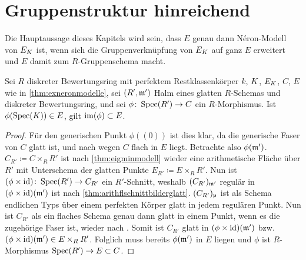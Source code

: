
  
\section{Gruppenstruktur hinreichend}\label{chap:gruppenstrukturhinreichend}
Die Hauptaussage dieses Kapitels wird sein, dass $E$ genau dann
Néron-Modell von $E_{K}$ ist, wenn sich die Gruppenverknüpfung von
$E_{K}$ auf ganz $E$ erweitert und $E$ damit zum $R$-Gruppenschema
macht.
\begin{Lemma}\label{thm:schnittearithmflglatt}
  Sei $R$ diskreter Bewertungsring mit perfektem Restklassenkörper
  $k$, $K$, $E_{K}$, $C$, $E$ wie in \ref{thm:exneronmodelle},
  sei $(R',\mathfrak{m}')$ Halm eines glatten $R$-Schemas und diskreter
  Bewertungsring,
  und sei $\phi\colon \operatorname{Spec}(R')\to C$ ein $R$-Morphismus.
  Ist $\phi(\operatorname{Spec}(K))\in E$, gilt $\operatorname{im}(\phi)\subset E$.
  \begin{proof}
    Für den generischen Punkt $\phi((0))$ ist dies klar, da die
    generische Faser von $C$ glatt ist, und nach
    \cite[8.5, Proposition 17]{bosch} wegen $C$ flach in $E$ liegt.
    Betrachte also $\phi(\mathfrak{m}')$.
    $C_{R'}\coloneqq C\times_R R'$ ist nach
    \ref{thm:eigminmodell} wieder eine arithmetische Fläche über
    $R'$ mit Unterschema der glatten Punkte
    $E_{R'}\coloneqq E\times_R R'$.
    Nun ist $(\phi\times\mathrm{id})\colon\operatorname{Spec}(R')\to C_{R'}$ ein
    $R'$-Schnitt, weshalb $(C_{R'})_{\mathfrak{m}'}$ regulär in
    $(\phi\times\mathrm{id})(\mathfrak{m}')$ ist nach
    \ref{thm:arithflschnittbilderglatt}.
    $(C_{R'})_{\mathfrak{p}}$ ist als Schema endlichen Typs über einem
    perfekten Körper glatt in jedem regulären Punkt.
    Nun ist $C_{R'}$ als ein flaches Schema genau dann glatt in
    einem Punkt, wenn es die zugehörige Faser ist, wieder nach
    \cite[8.5, Proposition 17]{bosch}.
    Somit ist $C_{R'}$ glatt in $(\phi\times\mathrm{id})(\mathfrak{m}')$ bzw.
    $(\phi\times\mathrm{id})(\mathfrak{m}')\in E\times_R R'$. Folglich muss bereits
    $\phi(\mathfrak{m}')$ in $E$ liegen und $\phi$ ist $R$-Morphismus
    $\operatorname{Spec}(R')\to E\subset C$.
  \end{proof}
\end{Lemma}  

